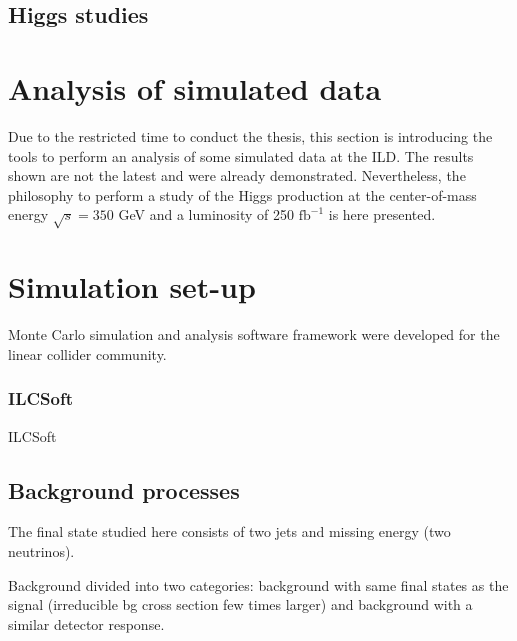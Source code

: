     \subsection{Higgs studies}

  \section{Analysis of simulated data}
  
    Due to the restricted time to conduct the thesis, this section is introducing the tools to perform an analysis of some simulated data at the ILD. 
    The results shown are not the latest and were already demonstrated. 
    Nevertheless, the philosophy to perform a study of the Higgs production at the center-of-mass energy $\sqrt{s} = 350$ GeV and a luminosity of 250 $\text{fb}^{-1}$ is here presented.
  
  \section{Simulation set-up}  
  
    Monte Carlo simulation and analysis software framework were developed for the linear collider community.

    \subsubsection{ILCSoft}


    ILCSoft\cite{ilcsoft}

  \subsection{Background processes}
  
    The final state studied here consists of two jets and missing energy (two neutrinos). 
    

   Background divided into two categories: background with same final states as the signal (irreducible bg cross section few times larger) and background with a similar detector response.
   
